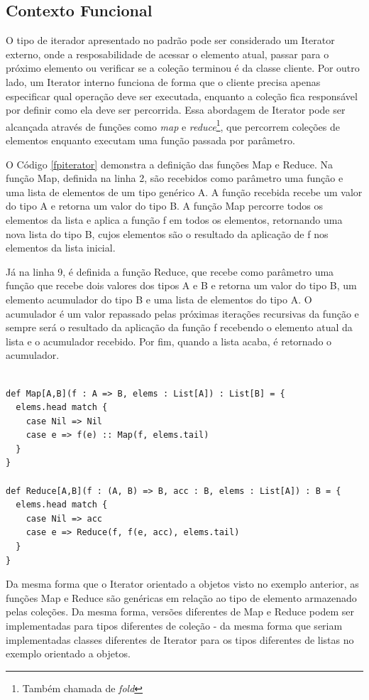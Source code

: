 \subsection*{Contexto Funcional}

O tipo de iterador apresentado no padrão pode 
ser considerado um Iterator externo, onde a 
resposabilidade de acessar o elemento atual, 
passar para o próximo elemento ou verificar se 
a coleção terminou é da classe cliente. Por 
outro lado, um Iterator interno funciona de forma 
que o cliente precisa apenas especificar qual 
operação deve ser executada, enquanto a 
coleção fica responsável por definir como ela 
deve ser percorrida. Essa abordagem de Iterator 
pode ser alcançada através de funções como  
\textit{map} e \textit{reduce}\footnote{Também 
chamada de \textit{fold}}, que percorrem coleções 
de elementos enquanto executam uma função 
passada por parâmetro.\cite{iteratoressence}

O Código \ref{fpiterator} demonstra a definição 
das funções Map e Reduce. Na função Map, definida 
na linha 2, são recebidos como parâmetro uma 
função e uma lista de elementos de um tipo 
genérico A. A função recebida recebe um valor 
do tipo A e retorna um valor do tipo B. A função 
Map percorre todos os elementos da lista e 
aplica a função f em todos os elementos, 
retornando uma nova lista do tipo B, cujos 
elementos são o resultado da aplicação de f nos 
elementos da lista inicial.

Já na linha 9, é definida a função Reduce, que 
recebe como parâmetro uma função que recebe dois 
valores dos tipos A e B e retorna um valor do 
tipo B, um elemento acumulador do tipo B e uma 
lista de elementos do tipo A. O acumulador 
é um valor repassado pelas próximas iterações 
recursivas da função e sempre será o resultado 
da aplicação da função f recebendo o elemento 
atual da lista e o acumulador recebido. 
Por fim, quando a lista acaba, é retornado o 
acumulador. 

\begin{lstlisting}[caption={Exemplos de Iterator: Map e Reduce},label=fpiterator]
    
def Map[A,B](f : A => B, elems : List[A]) : List[B] = {
  elems.head match {
    case Nil => Nil
    case e => f(e) :: Map(f, elems.tail)
  }
}

def Reduce[A,B](f : (A, B) => B, acc : B, elems : List[A]) : B = {
  elems.head match {
    case Nil => acc
    case e => Reduce(f, f(e, acc), elems.tail)
  }
}

\end{lstlisting}

Da mesma forma que o Iterator orientado a 
objetos visto no exemplo anterior, as funções 
Map e Reduce são genéricas em relação ao tipo 
de elemento armazenado pelas coleções. Da 
mesma forma, versões diferentes de Map e 
Reduce podem ser implementadas para tipos 
diferentes de coleção - da mesma forma que 
seriam implementadas classes diferentes de 
Iterator para os tipos diferentes de listas 
no exemplo orientado a objetos. 
